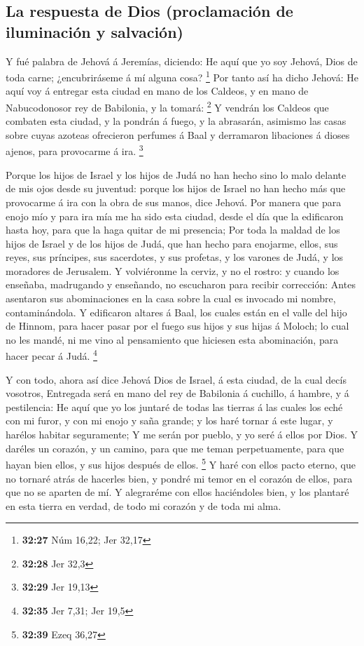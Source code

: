 \hypertarget{la-respuesta-de-dios-proclamaciuxf3n-de-iluminaciuxf3n-y-salvaciuxf3n}{%
\subsection{La respuesta de Dios (proclamación de iluminación y
salvación)}\label{la-respuesta-de-dios-proclamaciuxf3n-de-iluminaciuxf3n-y-salvaciuxf3n}}

 Y fué palabra de Jehová á Jeremías, diciendo:
 He aquí que yo soy Jehová, Dios de toda carne;
¿encubriráseme á mí alguna cosa? \footnote{\textbf{32:27} Núm 16,22; Jer
  32,17}  Por tanto así ha dicho Jehová: He aquí voy á
entregar esta ciudad en mano de los Caldeos, y en mano de Nabucodonosor
rey de Babilonia, y la tomará: \footnote{\textbf{32:28} Jer 32,3}
 Y vendrán los Caldeos que combaten esta ciudad, y la
pondrán á fuego, y la abrasarán, asimismo las casas sobre cuyas azoteas
ofrecieron perfumes á Baal y derramaron libaciones á dioses ajenos, para
provocarme á ira. \footnote{\textbf{32:29} Jer 19,13}

 Porque los hijos de Israel y los hijos de Judá no han
hecho sino lo malo delante de mis ojos desde su juventud: porque los
hijos de Israel no han hecho más que provocarme á ira con la obra de sus
manos, dice Jehová.  Por manera que para enojo mío y para
ira mía me ha sido esta ciudad, desde el día que la edificaron hasta
hoy, para que la haga quitar de mi presencia;  Por toda
la maldad de los hijos de Israel y de los hijos de Judá, que han hecho
para enojarme, ellos, sus reyes, sus príncipes, sus sacerdotes, y sus
profetas, y los varones de Judá, y los moradores de Jerusalem.
 Y volviéronme la cerviz, y no el rostro: y cuando los
enseñaba, madrugando y enseñando, no escucharon para recibir corrección:
 Antes asentaron sus abominaciones en la casa sobre la
cual es invocado mi nombre, contaminándola.  Y edificaron
altares á Baal, los cuales están en el valle del hijo de Hinnom, para
hacer pasar por el fuego sus hijos y sus hijas á Moloch; lo cual no les
mandé, ni me vino al pensamiento que hiciesen esta abominación, para
hacer pecar á Judá. \footnote{\textbf{32:35} Jer 7,31; Jer 19,5}

 Y con todo, ahora así dice Jehová Dios de Israel, á esta
ciudad, de la cual decís vosotros, Entregada será en mano del rey de
Babilonia á cuchillo, á hambre, y á pestilencia:  He aquí
que yo los juntaré de todas las tierras á las cuales los eché con mi
furor, y con mi enojo y saña grande; y los haré tornar á este lugar, y
harélos habitar seguramente;  Y me serán por pueblo, y yo
seré á ellos por Dios.  Y daréles un corazón, y un
camino, para que me teman perpetuamente, para que hayan bien ellos, y
sus hijos después de ellos. \footnote{\textbf{32:39} Ezeq 36,27}
 Y haré con ellos pacto eterno, que no tornaré atrás de
hacerles bien, y pondré mi temor en el corazón de ellos, para que no se
aparten de mí.  Y alegraréme con ellos haciéndoles bien,
y los plantaré en esta tierra en verdad, de todo mi corazón y de toda mi
alma.

